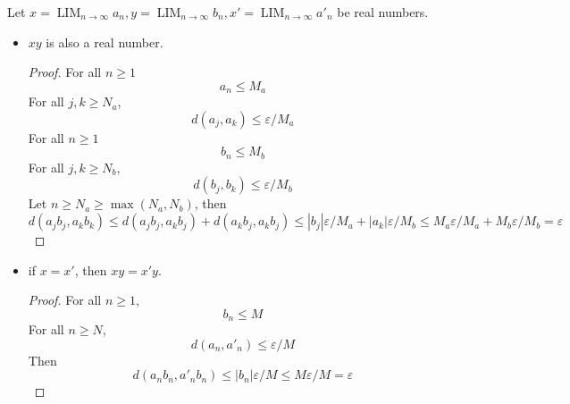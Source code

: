\documentclass{blog}
\DeclareMathOperator{\LIM}{LIM}
\begin{document}
\begin{proposition}
  Let $x = \LIM_{n \to \infty} a_{n}, y = \LIM_{n \to \infty} b_{n}, x' = \LIM_{n \to \infty} a'_{n}$
  be real numbers.
  \begin{itemize}
  \item $x y$ is also a real number.
    \begin{proof}
      For all $n \geq 1$
      \begin{equation*}
        a_{n} \leq M_{a}
      \end{equation*}
      For all $j, k \geq N_{a}$,
      \begin{equation*}
        d(a_{j}, a_{k}) \leq \varepsilon / M_{a}
      \end{equation*}
      For all $n \geq 1$
      \begin{equation*}
        b_{n} \leq M_{b}
      \end{equation*}
      For all $j, k \geq N_{b}$,
      \begin{equation*}
        d(b_{j}, b_{k}) \leq \varepsilon / M_{b}
      \end{equation*}
      Let $n \geq N_{a} \geq \max(N_{a}, N_{b})$, then
      \begin{equation*}
        d(a_{j} b_{j}, a_{k} b_{k}) \leq d(a_{j} b_{j}, a_{k} b_{j}) + d(a_{k} b_{j}, a_{k} b_{j})
        \leq |b_{j}| \varepsilon / M_{a} + |a_{k}|\varepsilon / M_{b}
        \leq M_{a} \varepsilon / M_{a} + M_{b} \varepsilon / M_{b} = \varepsilon
      \end{equation*}
    \end{proof}
  \item if $x = x'$, then $x y = x' y$.
    \begin{proof}
      For all $n \geq 1$,
      \begin{equation*}
        b_{n} \leq M
      \end{equation*}
      For all $n \geq N$,
      \begin{equation*}
        d(a_{n}, a'_{n}) \leq \varepsilon / M
      \end{equation*}
      Then
      \begin{equation}
        d(a_{n} b_{n}, a'_{n} b_{n}) \leq |b_{n}| \varepsilon / M \leq M \varepsilon / M = \varepsilon
      \end{equation}
    \end{proof}
  \end{itemize}
\end{proposition}
\end{document}
